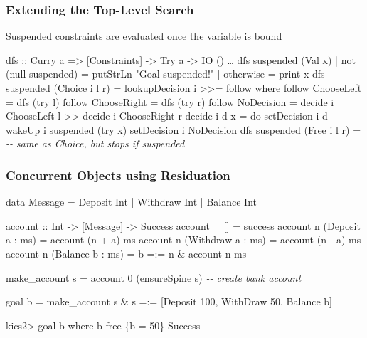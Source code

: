 \documentclass[
,hyperref={pdfpagelabels=false}
,xcolor=dvipsnames
]{beamer}
\newcommand{\comment}[1]{\textsl{-{}- #1}}
\begin{document}
\begin{frame}[fragile]%
\frametitle{Extending the Top-Level Search}

Suspended constraints are evaluated once the variable is bound

\begin{haskell}
dfs :: Curry a => \alert{[Constraints] ->} Try a -> IO ()
\ldots
dfs suspended (Val x)
  \alert{| not (null suspended) = putStrLn "Goal suspended!"}
  | otherwise            = print x
dfs suspended (Choice i l r) = lookupDecision i >>= follow
  where
  follow ChooseLeft  = dfs (try l)
  follow ChooseRight = dfs (try r)
  follow NoDecision  = decide i ChooseLeft l >> decide i ChooseRight r \medskip
  decide i d x       = do setDecision i d
                          \alert{wakeUp i suspended (try x)}
                          setDecision i NoDecision
dfs suspended (Free   i l r) = \comment{same as Choice, but stops if suspended}
\end{haskell}
\end{frame}

\begin{frame}[fragile]%
\frametitle{Concurrent Objects using Residuation}

\begin{curry}
data Message = Deposit Int | Withdraw Int | Balance Int

account :: Int -> [Message] -> Success
account _ []                 =  success
account n (Deposit  a : ms)  =  account (n + a) ms
account n (Withdraw a : ms)  =  account (n - a) ms
account n (Balance  b : ms)  =  b =:= n \& account n ms

make_account s = account 0 (ensureSpine s) \comment{create bank account}

goal b = make_account s
       \& s =:= [Deposit 100, WithDraw 50, Balance b]
\end{curry}

\begin{kics2}
kics2> goal b where b free
\{b = 50\} Success
\end{kics2}

\end{frame}
\end{document}
